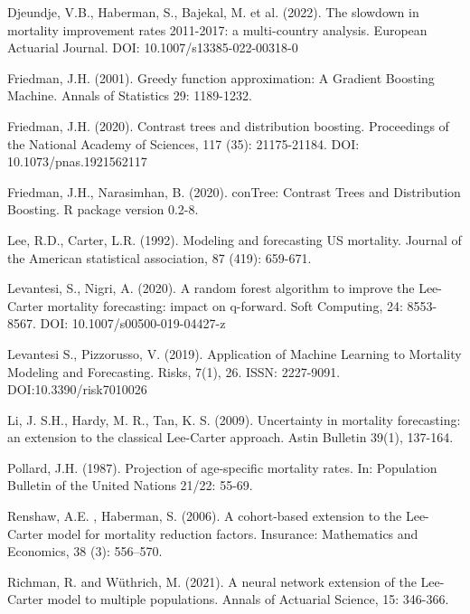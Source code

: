 \documentclass[fleqn,10pt]{wlscirep}
\begin{document}
\begin{thebibliography}{99}
Djeundje, V.B., Haberman, S., Bajekal, M. et al. (2022). The slowdown in mortality improvement rates 2011-2017: a multi-country analysis. European Actuarial Journal. DOI: 10.1007/s13385-022-00318-0

Friedman, J.H. (2001). Greedy function approximation: A Gradient Boosting Machine. Annals of Statistics 29: 1189-1232.

Friedman, J.H. (2020). Contrast trees and distribution boosting. Proceedings of the National Academy of Sciences, 117 (35): 21175-21184. DOI: 10.1073/pnas.1921562117

Friedman, J.H., Narasimhan, B. (2020). conTree: Contrast Trees and Distribution Boosting. R package version 0.2-8.

Lee, R.D., Carter, L.R. (1992). Modeling and forecasting US mortality. Journal of the American statistical association, 87 (419): 659-671.

Levantesi, S., Nigri, A. (2020). A random forest algorithm to improve the Lee-Carter mortality forecasting: impact on q-forward. Soft Computing, 24: 8553-8567. DOI: 10.1007/s00500-019-04427-z

Levantesi S., Pizzorusso, V. (2019). Application of Machine Learning to Mortality Modeling and Forecasting. Risks, 7(1), 26. ISSN: 2227-9091. DOI:10.3390/risk7010026

Li, J. S.H.,  Hardy, M. R., Tan, K. S. (2009). Uncertainty in mortality forecasting: an extension to the classical Lee-Carter approach. Astin Bulletin 39(1), 137-164.

Pollard, J.H. (1987). Projection of age-specific mortality rates. In: Population Bulletin of the United Nations 21/22: 55-69.

Renshaw, A.E. , Haberman, S. (2006). A cohort-based extension to the Lee-Carter model for mortality reduction factors. Insurance: Mathematics and Economics, 38 (3): 556–570.

Richman, R. and W\"uthrich, M. (2021). A neural network extension of the Lee-Carter model to multiple populations. Annals of Actuarial Science, 15: 346-366.


\end{thebibliography}
\end{document}
